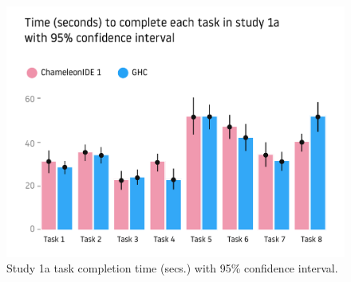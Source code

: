 



\begin{figure}
    \centering
    \includegraphics[width=0.8\linewidth,trim=0mm 12mm 0mm 35mm,clip]{images/user-study-1a.pdf}
    \caption{Study 1a task completion time (secs.) with 95\% confidence interval.}
    \label{fig:analysis-1a}
\end{figure}


